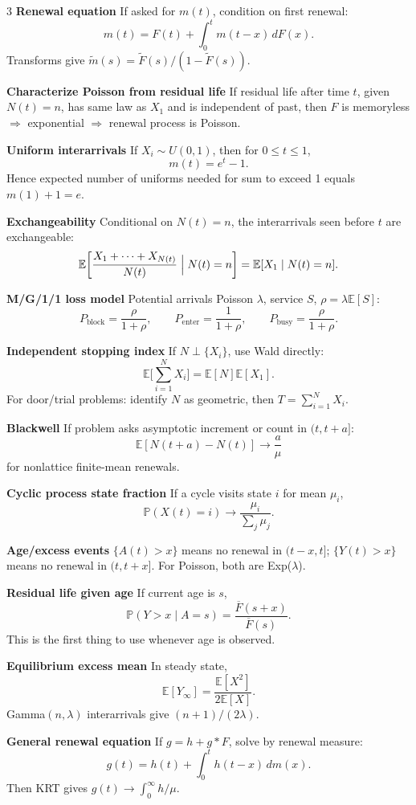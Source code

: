 \documentclass[a4paper,8pt,fleqn]{extarticle}
\newcommand{\E}{\mathbb{E}}
\newcommand{\PP}{\mathbb{P}}
\newcommand{\1}{\mathbf{1}}
\newcommand{\barF}{\overline{F}}
\newcommand{\sub}[1]{\textbf{#1} }
\begin{document}
\begin{multicols}{3}
\sub{Renewal equation} If asked for \(m(t)\), condition on first renewal:
\[
m(t)=F(t)+\int_0^t m(t-x)\,dF(x).
\]
Transforms give \(\tilde m(s)=\tilde F(s)/(1-\tilde F(s))\).

\sub{Characterize Poisson from residual life} If residual life after time \(t\), given \(N(t)=n\), has same law as \(X_1\) and is independent of past, then \(F\) is memoryless \(\Rightarrow\) exponential \(\Rightarrow\) renewal process is Poisson.

\sub{Uniform interarrivals} If \(X_i\sim U(0,1)\), then for \(0\le t\le1\),
\[
m(t)=e^t-1.
\]
Hence expected number of uniforms needed for sum to exceed 1 equals \(m(1)+1=e\).

\sub{Exchangeability} Conditional on \(N(t)=n\), the interarrivals seen before \(t\) are exchangeable:
\[
\E\!\left[\frac{X_1+\cdots+X_{N(t)}}{N(t)}\Bigm|N(t)=n\right]=\E[X_1\mid N(t)=n].
\]

\sub{M/G/1/1 loss model} Potential arrivals Poisson \(\lambda\), service \(S\), \(\rho=\lambda\E[S]\):
\[
P_{\text{block}}=\frac{\rho}{1+\rho},\qquad
P_{\text{enter}}=\frac{1}{1+\rho},\qquad
P_{\text{busy}}=\frac{\rho}{1+\rho}.
\]

\sub{Independent stopping index} If \(N\perp\{X_i\}\), use Wald directly:
\[
\E\Big[\sum_{i=1}^N X_i\Big]=\E[N]\E[X_1].
\]
For door/trial problems: identify \(N\) as geometric, then \(T=\sum_{i=1}^N X_i\).

\sub{Blackwell} If problem asks asymptotic increment or count in \((t,t+a]\):
\[
\E[N(t+a)-N(t)]\to \frac{a}{\mu}
\]
for nonlattice finite-mean renewals.

\sub{Cyclic process state fraction} If a cycle visits state \(i\) for mean \(\mu_i\),
\[
\PP(X(t)=i)\to \frac{\mu_i}{\sum_j \mu_j}.
\]

\sub{Age/excess events} \(\{A(t)>x\}\) means no renewal in \((t-x,t]\); \(\{Y(t)>x\}\) means no renewal in \((t,t+x]\). For Poisson, both are Exp(\(\lambda\)).

\sub{Residual life given age} If current age is \(s\),
\[
\PP(Y>x\mid A=s)=\frac{\barF(s+x)}{\barF(s)}.
\]
This is the first thing to use whenever age is observed.

\sub{Equilibrium excess mean} In steady state,
\[
\E[Y_\infty]=\frac{\E[X^2]}{2\E[X]}.
\]
Gamma\((n,\lambda)\) interarrivals give \((n+1)/(2\lambda)\).

\sub{General renewal equation} If \(g=h+g*F\), solve by renewal measure:
\[
g(t)=h(t)+\int_0^t h(t-x)\,dm(x).
\]
Then KRT gives \(g(t)\to \int_0^\infty h/\mu\).


\end{multicols}
\end{document}
